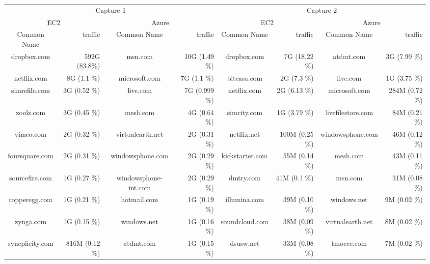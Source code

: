 \begin{tabular}{|c|r|c|r|c|r|c|r|} \hline
\multicolumn{4}{|c|}{Capture 1} & \multicolumn{4}{|c|}{Capture 2}\\
\multicolumn{2}{|c|}{EC2} & \multicolumn{2}{|c|}{Azure} & \multicolumn{2}{|c|}{EC2} & \multicolumn{2}{|c|}{Azure} \\
\hline
Common Name & traffic  & Common Name & traffic & Common Name & traffic & Common Name & traffic \\ \hline
dropbox.com & 592G (83.8\%) & msn.com & 10G (1.49 \%) & dropbox.com & 7G (18.22 \%) & atdmt.com & 3G (7.99 \%) \\
netflix.com & 8G (1.1 \%) & microsoft.com & 7G (1.1 \%) & bitcasa.com & 2G (7.3 \%) & live.com & 1G (3.75 \%) \\
sharefile.com & 3G (0.52 \%) & live.com & 7G (0.999 \%) &  netflix.com & 2G (6.13 \%) & microsoft.com & 284M (0.72 \%) \\
zoolz.com & 3G (0.45 \%) & mesh.com & 4G (0.64 \%) & simcity.com & 1G (3.79 \%) & livefilestore.com & 84M (0.21 \%) \\
vimeo.com & 2G (0.32 \%) & virtualearth.net & 2G (0.31 \%) & netflix.net & 100M (0.25 \%) & windowsphone.com & 46M (0.12 \%) \\
foursquare.com &  2G (0.31 \%) & windowsphone.com & 2G (0.29 \%) & kickstarter.com & 55M (0.14 \%) & mesh.com & 43M (0.11 \%) \\
sourcefire.com & 1G (0.27 \%) & windowsphone-int.com & 2G (0.29 \%) & dmtry.com & 41M (0.1 \%) & msn.com & 31M (0.08 \%) \\
copperegg.com & 1G (0.21 \%) & hotmail.com & 1G (0.19 \%) & illumina.com & 39M (0.10 \%) & windows.net & 9M (0.02 \%) \\
zynga.com & 1G (0.15 \%) & windows.net & 1G (0.16 \%) & soundcloud.com & 38M (0.09 \%) & virtualearth.net & 8M (0.02 \%) \\
syncplicity.com &  816M (0.12 \%) & atdmt.com & 1G (0.15 \%) & dsusw.net & 33M (0.08 \%) & tmocce.com & 7M (0.02 \%) \\
\hline
\end{tabular}



